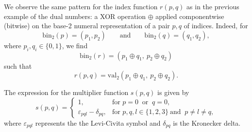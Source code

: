 \documentclass{article}
\begin{document}
\begin{enumerate}
We observe the same pattern for the index function $r(p,q)$ as in the previous example of the dual numbers: a XOR operation $\oplus$ applied componentwise (bitwise) on the base-2 numeral representation of a pair $p,q$ of indices. Indeed, for 
\begin{equation}
\label{binpq}
\mathrm{bin}_2(p)=(p_1,p_2) \qquad \text{and}\qquad  \mathrm{bin}_2(q)=(q_1,q_2),
\end{equation}
where $p_i,q_i\in \{0,1\}$, we find
$$ 
\mathrm{bin}_2(r) = (p_1\oplus q_1,\ p_2\oplus q_2) 
$$
such that
\begin{equation}
\label{rquaternions}
    r(p,q)=\mathrm{val}_2(p_1\oplus q_1,\ p_2\oplus q_2).
\end{equation}



The expression for the multiplier function $s(p,q)$ is given by
$$ 
s(p,q) = \begin{cases}
    1, & \text{for } p=0 \ \text{ or }\ q = 0,\\
    \varepsilon_{pql} - \delta_{pq}, & \text{for } p,q,l \in \{ 1,2,3 \}\ \text{and }\ p \neq l \neq q,
\end{cases} 
$$
where $\varepsilon_{pql}$ represents the the Levi-Civita symbol and $\delta_{pq}$ is the Kronecker delta.


\end{enumerate}
\end{document}

